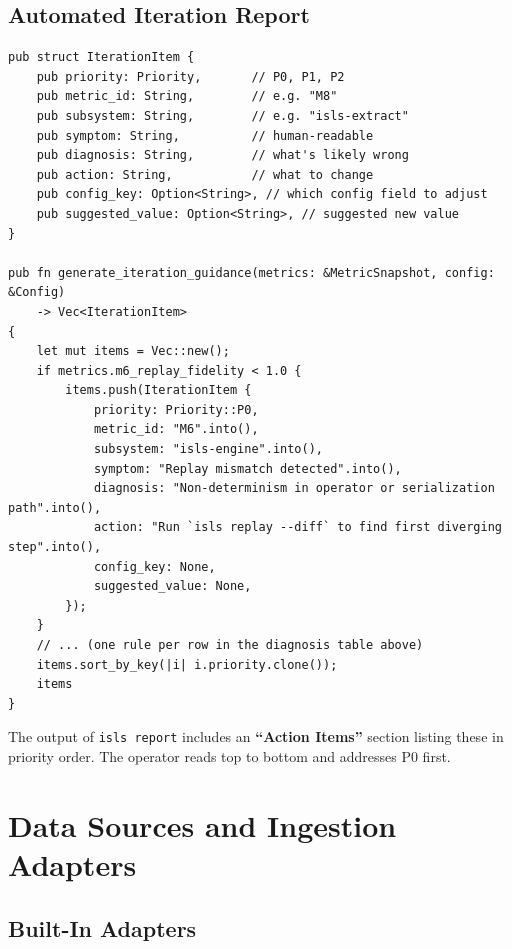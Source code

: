 \documentclass[10pt,a4paper]{article}
\begin{document}
\subsection{Automated Iteration Report}

\begin{lstlisting}[style=rust]
pub struct IterationItem {
    pub priority: Priority,       // P0, P1, P2
    pub metric_id: String,        // e.g. "M8"
    pub subsystem: String,        // e.g. "isls-extract"
    pub symptom: String,          // human-readable
    pub diagnosis: String,        // what's likely wrong
    pub action: String,           // what to change
    pub config_key: Option<String>, // which config field to adjust
    pub suggested_value: Option<String>, // suggested new value
}

pub fn generate_iteration_guidance(metrics: &MetricSnapshot, config: &Config)
    -> Vec<IterationItem>
{
    let mut items = Vec::new();
    if metrics.m6_replay_fidelity < 1.0 {
        items.push(IterationItem {
            priority: Priority::P0,
            metric_id: "M6".into(),
            subsystem: "isls-engine".into(),
            symptom: "Replay mismatch detected".into(),
            diagnosis: "Non-determinism in operator or serialization path".into(),
            action: "Run `isls replay --diff` to find first diverging step".into(),
            config_key: None,
            suggested_value: None,
        });
    }
    // ... (one rule per row in the diagnosis table above)
    items.sort_by_key(|i| i.priority.clone());
    items
}
\end{lstlisting}

The output of \texttt{isls report} includes an \textbf{``Action Items''} section listing these in priority order. The operator reads top to bottom and addresses P0 first.

\section{Data Sources and Ingestion Adapters}
\label{sec:sources}

\subsection{Built-In Adapters}
\end{document}
